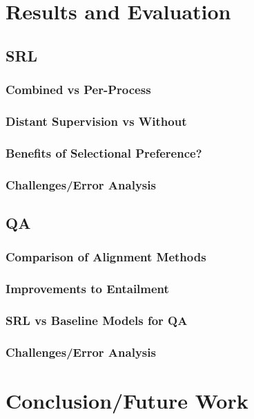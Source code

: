 \documentclass[11pt,a4paper]{article}
\begin{document}
\section{Results and Evaluation}
	\subsection{SRL}
		\subsubsection{Combined vs Per-Process}
		\subsubsection{Distant Supervision vs Without}
		\subsubsection{Benefits of Selectional Preference?}
		\subsubsection{Challenges/Error Analysis}
	\subsection{QA}
		\subsubsection{Comparison of Alignment Methods}
		\subsubsection{Improvements to Entailment}
		\subsubsection{SRL vs Baseline Models for QA}
		\subsubsection{Challenges/Error Analysis}

\section{Conclusion/Future Work}
\end{document}
